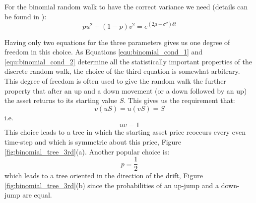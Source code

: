 For the binomial random walk to have the correct variance we need (details can be found in \cite{pw_mathfinderiv_1995}):
\begin{equation}
    pu^2 + (1-p)v^2 = e^{\left( 2\mu + \sigma^2 \right)\delta t}
    \label{equ:binomial_cond_2}
\end{equation}

Having only two equations for the three parameters gives us one degree of freedom in this choice. As Equations \ref{equ:binomial_cond_1} and \ref{equ:binomial_cond_2} determine all the statistically important properties of the discrete random walk, the choice of the third equation is somewhat arbitrary. This degree of freedom is often used to give the random walk the further property that after an up and a down movement (or a down followed by an up) the asset returns to its starting value $S$. This gives us the requirement that:
\begin{equation}
    v(uS) = u(vS) = S
\end{equation}
i.e. 
\begin{equation}
	uv = 1
	\label{equ:binomial_cond_3}
\end{equation}
This choice leads to a tree in which the starting asset price reoccurs every even time-step and which is symmetric about this price, Figure \ref{fig:binomial_tree_3rd}(a). Another popular choice is:
\begin{equation}
    p = \frac{1}{2}
\end{equation}
which leads to a tree oriented in the direction of the drift, Figure \ref{fig:binomial_tree_3rd}(b) since the probabilities of an up-jump and a down-jump are equal.

